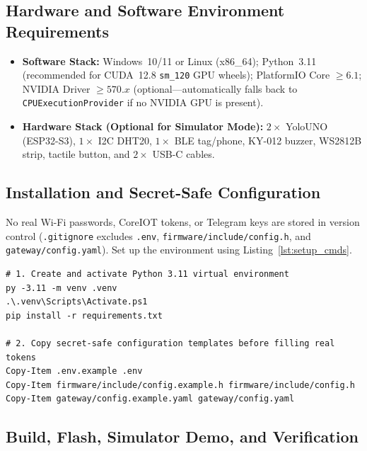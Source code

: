 \documentclass{hcmut-report}
\begin{document}
\subsection[Environment Requirements]{Hardware and Software Environment Requirements}
\label{sec:env_req}

\begin{itemize}
  \item \textbf{Software Stack:} Windows~10/11 or Linux (x86\_64); Python~3.11 (recommended for CUDA~12.8 \texttt{sm\_120} GPU wheels); PlatformIO Core $\ge 6.1$; NVIDIA Driver $\ge 570.x$ (optional---automatically falls back to \texttt{CPUExecutionProvider} if no NVIDIA GPU is present).
  \item \textbf{Hardware Stack (Optional for Simulator Mode):} $2\times$ YoloUNO (ESP32-S3), $1\times$ I2C DHT20, $1\times$ BLE tag/phone, KY-012 buzzer, WS2812B strip, tactile button, and $2\times$ USB-C cables.
\end{itemize}

\subsection[Installation and Configuration]{Installation and Secret-Safe Configuration}
\label{sec:install_cfg}

No real Wi-Fi passwords, CoreIOT tokens, or Telegram keys are stored in version control (\texttt{.gitignore} excludes \texttt{.env}, \texttt{firmware/include/config.h}, and \texttt{gateway/config.yaml}). Set up the environment using Listing~\ref{lst:setup_cmds}.

\begin{lstlisting}[caption={Environment Setup and Credential Template Initialization (PowerShell)},label={lst:setup_cmds}]
# 1. Create and activate Python 3.11 virtual environment
py -3.11 -m venv .venv
.\.venv\Scripts\Activate.ps1
pip install -r requirements.txt

# 2. Copy secret-safe configuration templates before filling real tokens
Copy-Item .env.example .env
Copy-Item firmware/include/config.example.h firmware/include/config.h
Copy-Item gateway/config.example.yaml gateway/config.yaml
\end{lstlisting}

\subsection[Build, Flash, and Run]{Build, Flash, Simulator Demo, and Verification}
\label{sec:build_run}
\end{document}
